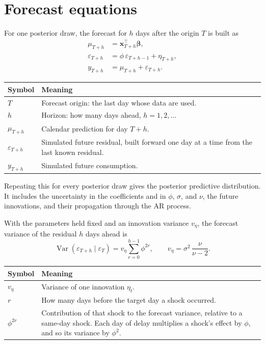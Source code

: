 \documentclass[11pt]{article}
\makeatletter
\DeclareMathOperator{\Var}{Var}
\newenvironment{reftable}[3]
  {\par\nopagebreak\addvspace{4pt}\noindent
   \renewcommand{\arraystretch}{1.3}%
   \begin{tabular}{@{}>{\raggedright\arraybackslash}p{#1\textwidth}
                      >{\raggedright\arraybackslash}p{\dimexpr0.97\textwidth-#1\textwidth-2\tabcolsep\relax}@{}}
   \toprule \textbf{#2} & \textbf{#3} \\ \midrule}
  {\bottomrule\end{tabular}\par\addvspace{8pt}}
\makeatother
\begin{document}
\section{Forecast equations}

For one posterior draw, the forecast for $h$ days after the origin $T$ is built
as
\begin{align}
\mu_{T+h} &= \mathbf{x}_{T+h}^{\top}\boldsymbol\beta, \label{eq:fc-mu}\\
\varepsilon_{T+h} &= \phi\,\varepsilon_{T+h-1} + \eta_{T+h}, \label{eq:fc-eps}\\
y_{T+h} &= \mu_{T+h} + \varepsilon_{T+h}. \label{eq:fc-y}
\end{align}

\begin{reftable}{0.2}{Symbol}{Meaning}
$T$ & Forecast origin: the last day whose data are used. \\
$h$ & Horizon: how many days ahead, $h = 1, 2, \ldots$ \\
$\mu_{T+h}$ & Calendar prediction for day $T+h$. \\
$\varepsilon_{T+h}$ & Simulated future residual, built forward one day at a time from the last known residual. \\
$y_{T+h}$ & Simulated future consumption. \\
\end{reftable}

Repeating this for every posterior draw gives the posterior predictive
distribution. It includes the uncertainty in the coefficients and in $\phi$,
$\sigma$, and $\nu$, the future innovations, and their propagation through the
AR process.

With the parameters held fixed and an innovation variance $v_\eta$, the
forecast variance of the residual $h$ days ahead is
\begin{equation}
\Var(\varepsilon_{T+h} \mid \varepsilon_T) = v_\eta \sum_{r=0}^{h-1}\phi^{2r},
\qquad
v_\eta = \sigma^2\,\frac{\nu}{\nu-2}.
\label{eq:fc-var}
\end{equation}

\begin{reftable}{0.2}{Symbol}{Meaning}
$v_\eta$ & Variance of one innovation $\eta_t$. \\
$r$ & How many days before the target day a shock occurred. \\
$\phi^{2r}$ & Contribution of that shock to the forecast variance, relative to a same-day shock. Each day of delay multiplies a shock's effect by $\phi$, and so its variance by $\phi^2$. \\
\end{reftable}
\end{document}

